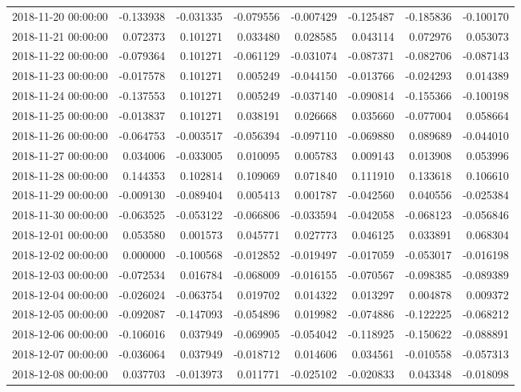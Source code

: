 \begin{tabular}{lrrrrrrr}
2018-11-20 00:00:00 & -0.133938 & -0.031335 & -0.079556 & -0.007429 & -0.125487 & -0.185836 & -0.100170 \\
2018-11-21 00:00:00 & 0.072373 & 0.101271 & 0.033480 & 0.028585 & 0.043114 & 0.072976 & 0.053073 \\
2018-11-22 00:00:00 & -0.079364 & 0.101271 & -0.061129 & -0.031074 & -0.087371 & -0.082706 & -0.087143 \\
2018-11-23 00:00:00 & -0.017578 & 0.101271 & 0.005249 & -0.044150 & -0.013766 & -0.024293 & 0.014389 \\
2018-11-24 00:00:00 & -0.137553 & 0.101271 & 0.005249 & -0.037140 & -0.090814 & -0.155366 & -0.100198 \\
2018-11-25 00:00:00 & -0.013837 & 0.101271 & 0.038191 & 0.026668 & 0.035660 & -0.077004 & 0.058664 \\
2018-11-26 00:00:00 & -0.064753 & -0.003517 & -0.056394 & -0.097110 & -0.069880 & 0.089689 & -0.044010 \\
2018-11-27 00:00:00 & 0.034006 & -0.033005 & 0.010095 & 0.005783 & 0.009143 & 0.013908 & 0.053996 \\
2018-11-28 00:00:00 & 0.144353 & 0.102814 & 0.109069 & 0.071840 & 0.111910 & 0.133618 & 0.106610 \\
2018-11-29 00:00:00 & -0.009130 & -0.089404 & 0.005413 & 0.001787 & -0.042560 & 0.040556 & -0.025384 \\
2018-11-30 00:00:00 & -0.063525 & -0.053122 & -0.066806 & -0.033594 & -0.042058 & -0.068123 & -0.056846 \\
2018-12-01 00:00:00 & 0.053580 & 0.001573 & 0.045771 & 0.027773 & 0.046125 & 0.033891 & 0.068304 \\
2018-12-02 00:00:00 & 0.000000 & -0.100568 & -0.012852 & -0.019497 & -0.017059 & -0.053017 & -0.016198 \\
2018-12-03 00:00:00 & -0.072534 & 0.016784 & -0.068009 & -0.016155 & -0.070567 & -0.098385 & -0.089389 \\
2018-12-04 00:00:00 & -0.026024 & -0.063754 & 0.019702 & 0.014322 & 0.013297 & 0.004878 & 0.009372 \\
2018-12-05 00:00:00 & -0.092087 & -0.147093 & -0.054896 & 0.019982 & -0.074886 & -0.122225 & -0.068212 \\
2018-12-06 00:00:00 & -0.106016 & 0.037949 & -0.069905 & -0.054042 & -0.118925 & -0.150622 & -0.088891 \\
2018-12-07 00:00:00 & -0.036064 & 0.037949 & -0.018712 & 0.014606 & 0.034561 & -0.010558 & -0.057313 \\
2018-12-08 00:00:00 & 0.037703 & -0.013973 & 0.011771 & -0.025102 & -0.020833 & 0.043348 & -0.018098 \\

\end{tabular}
